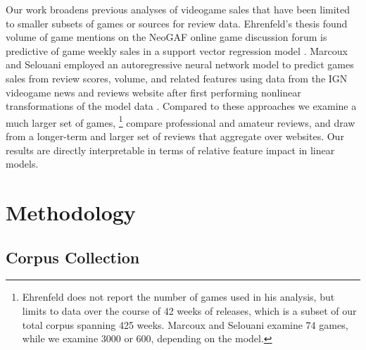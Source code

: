 \documentclass[letterpaper]{article}
\begin{document}
Our work broadens previous analyses of videogame sales that have been limited to smaller subsets of games or sources for review data. Ehrenfeld's thesis found volume of game mentions on the NeoGAF online game discussion forum is predictive of game weekly sales in a support vector regression model \cite{ehrenfeld2011predicting}. Marcoux and Selouani employed an autoregressive neural network model to predict games sales from review scores, volume, and related features using data from the IGN videogame news and reviews website after first performing nonlinear transformations of the model data \cite{marcoux2009hybrid}. Compared to these approaches we examine a much larger set of games,
\footnote{Ehrenfeld does not report the number of games used in his analysis, but limits to data over the course of 42 weeks of releases, which is a subset of our total corpus spanning 425 weeks. Marcoux and Selouani examine 74 games, while we examine 3000 or 600, depending on the model.}
compare professional and amateur reviews, and draw from a longer-term and larger set of reviews that aggregate over websites. Our results are directly interpretable in terms of relative feature impact in linear models.


\section{Methodology}

\subsection{Corpus Collection}
\end{document}
